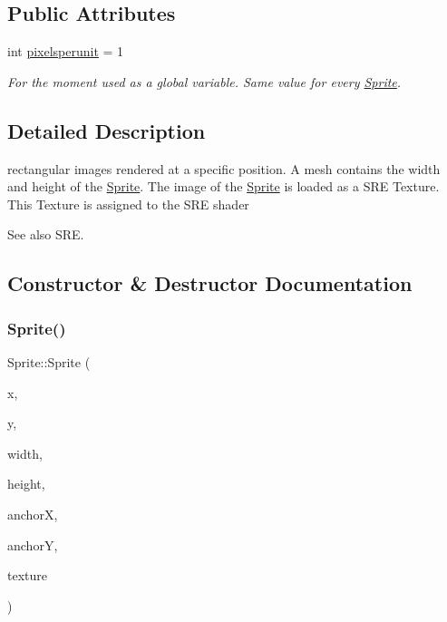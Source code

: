 \subsection*{Public Attributes}
\begin{DoxyCompactItemize}
\item 
int \hyperlink{class_mason_1_1_sprite_a5d5ba8a72349d94bbe9190efcb9715cc}{pixelsperunit} = 1
\begin{DoxyCompactList}\small\item\em For the moment used as a global variable. Same value for every \hyperlink{class_mason_1_1_sprite}{Sprite}. \end{DoxyCompactList}\end{DoxyCompactItemize}


\subsection{Detailed Description}
rectangular images rendered at a specific position. A mesh contains the width and height of the \hyperlink{class_mason_1_1_sprite}{Sprite}. The image of the \hyperlink{class_mason_1_1_sprite}{Sprite} is loaded as a S\+RE Texture. This Texture is assigned to the S\+RE shader 

\begin{DoxySeeAlso}{See also}
S\+RE. 
\end{DoxySeeAlso}


\subsection{Constructor \& Destructor Documentation}
\hypertarget{class_mason_1_1_sprite_a40dbab8285c1d3bdc95dfe1806736402}{}\label{class_mason_1_1_sprite_a40dbab8285c1d3bdc95dfe1806736402} 
\subsubsection{\texorpdfstring{Sprite()}{Sprite()}}
{\footnotesize\ttfamily Sprite\+::\+Sprite (\begin{DoxyParamCaption}\item[{int}]{x,  }\item[{int}]{y,  }\item[{int}]{width,  }\item[{int}]{height,  }\item[{float}]{anchorX,  }\item[{float}]{anchorY,  }\item[{std\+::shared\+\_\+ptr$<$ S\+R\+E\+::\+Texture $>$}]{texture }\end{DoxyParamCaption})}



